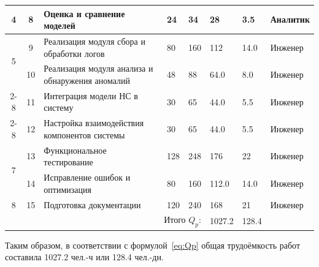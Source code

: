 {\begin{longtable}{|c|c|p{4cm}|p{1.6cm}|p{1.6cm}|p{1.5cm}|p{1.6cm}|p{2.5cm}|}
    4 & 8 & Оценка и сравнение моделей & 24 & 34  & 28  & 3.5  & Аналитик \\ \hline
        

    \multirow{2}{*}{5}
        & 9 & Реализация модуля сбора и обработки логов
        & 80 & 160  & 112  & 14.0  & Инженер \\ \cline{2-8}
        & 10 & Реализация модуля анализа и обнаружения аномалий
        & 48 & 88  & 64.0  & 8.0  & Инженер \\ \cline{2-8}

    \multirow{2}{*}{6}
        & 11 & Интеграция модели НС в систему
        & 30 & 65  & 44.0  & 5.5  & Инженер \\ \cline{2-8}
        & 12 & Настройка взаимодействия компонентов системы
        & 30 & 65  & 44.0  & 5.5  & Инженер \\ \hline

    \multirow{2}{*}{7}
        & 13 & Функциональное тестирование
        & 128 & 248 & 176  & 22 & Инженер \\ \cline{2-8}
        & 14 & Исправление ошибок и оптимизация
        & 80 & 160 & 112.0 & 14.0 & Инженер \\ \hline

    8 & 15 & Подготовка документации & 120 & 240 & 168  & 21 & Инженер \\ \hline

    \multicolumn{5}{|r|}{Итого $Q_p$:}
        & 1027.2
        & 128.4
        & \\ \hline

\end{longtable}
}

Таким образом, в соответствии с формулой~\eqref{eq:Qp} общая трудоёмкость работ составила 1027.2 чел.-ч или 128.4 чел.-дн.